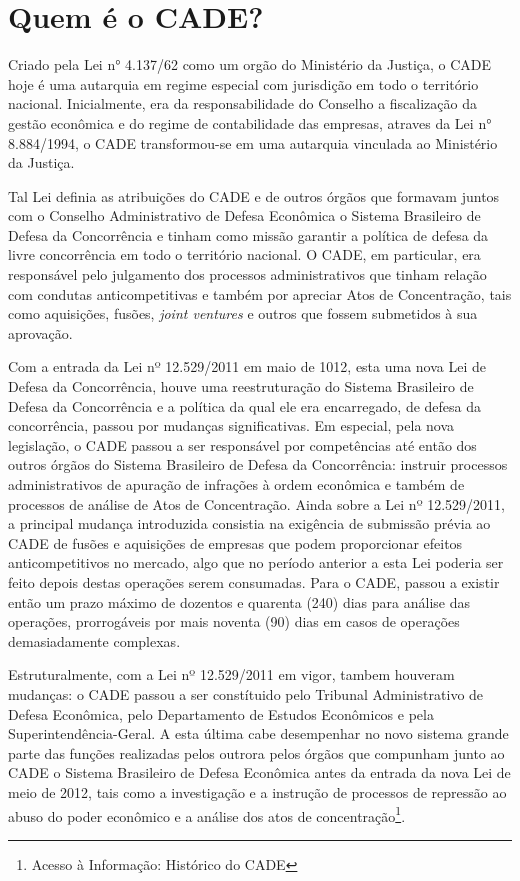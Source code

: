 \documentclass[11pt]{report}
\begin{document}
\section{Quem é o CADE?}

\indent\indent Criado pela Lei n° 4.137/62 como um orgão do Ministério da Justiça, o CADE hoje é uma autarquia em regime especial com jurisdição em todo o território nacional. Inicialmente,
era da responsabilidade do Conselho a fiscalização da gestão econômica e do regime de contabilidade das empresas, atraves da Lei n° 8.884/1994, o CADE transformou-se em uma
autarquia vinculada ao Ministério da Justiça.

Tal Lei definia as atribuições do CADE e de outros órgãos que formavam juntos com o Conselho Administrativo de Defesa Econômica o Sistema Brasileiro de Defesa da Concorrência e tinham
como missão garantir a política de defesa da livre concorrência em todo o território nacional. O CADE, em particular, era responsável pelo julgamento dos processos administrativos
que tinham relação com condutas anticompetitivas e também por apreciar Atos de Concentração, tais como aquisições, fusões, \textit{joint ventures} e outros que fossem submetidos
à sua aprovação.

Com a entrada da Lei nº 12.529/2011 em maio de 1012, esta uma nova Lei de Defesa da Concorrência, houve uma reestruturação do Sistema Brasileiro de Defesa da Concorrência e a política
da qual ele era encarregado, de defesa da concorrência, passou por mudanças significativas. Em especial, pela nova legislação, o CADE passou a ser responsável por competências até
então dos outros órgãos do Sistema Brasileiro de Defesa da Concorrência: instruir processos administrativos de apuração de infrações à ordem econômica e também de processos de análise
de Atos de Concentração. Ainda sobre a Lei nº 12.529/2011, a principal mudança introduzida consistia na exigência de submissão
prévia ao CADE de fusões e aquisições de empresas que podem proporcionar efeitos anticompetitivos no mercado, algo que no período anterior a esta Lei poderia ser feito depois destas
operações serem consumadas. Para o CADE, passou a existir então um prazo máximo de dozentos e quarenta (240) dias para análise das operações, prorrogáveis por mais noventa (90) dias
em casos de operações demasiadamente complexas.

Estruturalmente, com a Lei nº 12.529/2011 em vigor, tambem houveram mudanças: o CADE passou a ser constítuido pelo Tribunal Administrativo de Defesa Econômica, pelo Departamento de
Estudos Econômicos e pela Superintendência-Geral. A esta última cabe desempenhar no novo sistema grande parte das funções realizadas pelos outrora pelos órgãos que compunham junto
ao CADE o Sistema Brasileiro de Defesa Econômica antes da entrada da nova Lei de meio de 2012, tais como a investigação e a instrução de processos de repressão ao abuso do poder
econômico e a análise dos atos de concentração\footnote[3]{Acesso à Informação: Histórico do CADE}.
\end{document}
